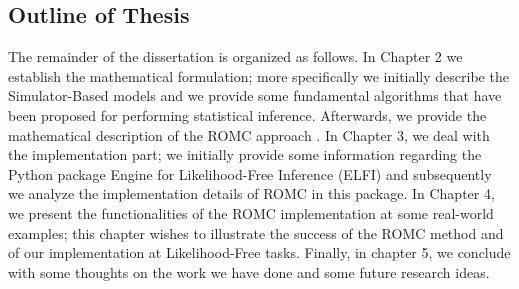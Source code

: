 \subsection{Outline of Thesis}
\label{subsec:outline-of-thesis}

The remainder of the dissertation is organized as follows. In Chapter
2 we establish the mathematical formulation; more specifically we
initially describe the Simulator-Based models and we provide some
fundamental algorithms that have been proposed for performing
statistical inference. Afterwards, we provide the mathematical
description of the ROMC approach \cite{Ikonomov2019}. In Chapter 3, we
deal with the implementation part; we initially provide some
information regarding the Python package Engine for Likelihood-Free
Inference (ELFI) \cite{1708.00707} and subsequently we analyze the
implementation details of ROMC in this package. In Chapter 4, we
present the functionalities of the ROMC implementation at some
real-world examples; this chapter wishes to illustrate the success of
the ROMC method and of our implementation at Likelihood-Free
tasks. Finally, in chapter 5, we conclude with some thoughts on the
work we have done and some future research ideas.
